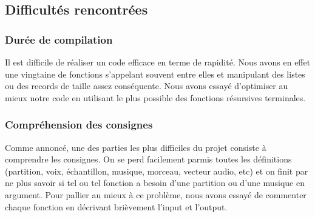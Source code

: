 \documentclass[10pt,a4paper]{article}
\begin{document}
\subsection{Difficultés rencontrées}
\subsubsection{Durée de compilation}
Il est difficile de réaliser un code efficace en terme de rapidité. Nous avons en effet une
vingtaine de fonctions s'appelant souvent entre elles et manipulant des listes
ou des records de taille assez conséquente. Nous avons essayé d'optimiser au mieux notre
code en utilisant le plus possible des fonctions résursives terminales.

\subsubsection{Compréhension des consignes}
Comme annoncé, une des parties les plus difficiles du projet consiste à 
comprendre les consignes. On se perd facilement parmis toutes les définitions
(partition, voix, échantillon, musique, morceau, vecteur audio, etc) et on finit
par ne plus savoir si tel ou tel fonction a besoin d'une partition ou d'une musique
en argument. Pour pallier au mieux à ce problème, nous avons essayé de commenter
chaque fonction en décrivant brièvement l'input et l'output. 
\newpage
\end{document}
